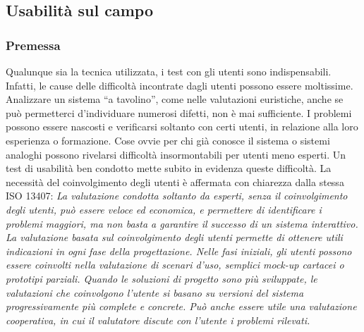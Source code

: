 \subsection{Usabilità sul campo}
    \subsubsection{Premessa}
        \begin{flushleft}
        Qualunque sia la tecnica utilizzata, i test con gli utenti sono indispensabili. Infatti, le cause delle difficoltà incontrate
        dagli utenti possono essere moltissime. Analizzare un sistema “a tavolino”, come nelle valutazioni euristiche, anche se
        può permetterci d'individuare numerosi difetti, non è mai sufficiente. I problemi possono essere nascosti e verificarsi
        soltanto con certi utenti, in relazione alla loro esperienza o formazione. Cose ovvie per chi già conosce il sistema o
        sistemi analoghi possono rivelarsi difficoltà insormontabili per utenti meno esperti. Un test di usabilità ben condotto
        mette subito in evidenza queste difficoltà. La necessità del coinvolgimento degli utenti è affermata con chiarezza dalla
        stessa ISO 13407: 
            \emph{La valutazione condotta soltanto da esperti, senza il coinvolgimento degli utenti, può essere veloce ed
            economica, e permettere di identificare i problemi maggiori, ma non basta a garantire il successo di un
            sistema interattivo. La valutazione basata sul coinvolgimento degli utenti permette di ottenere utili indicazioni
            in ogni fase della progettazione. Nelle fasi iniziali, gli utenti possono essere coinvolti nella valutazione di
            scenari d’uso, semplici mock-up cartacei o prototipi parziali. Quando le soluzioni di progetto sono più
            sviluppate, le valutazioni che coinvolgono l’utente si basano su versioni del sistema progressivamente più
            complete e concrete. Può anche essere utile una valutazione cooperativa, in cui il valutatore discute con
            l’utente i problemi rilevati.}
        \end{flushleft}
    
